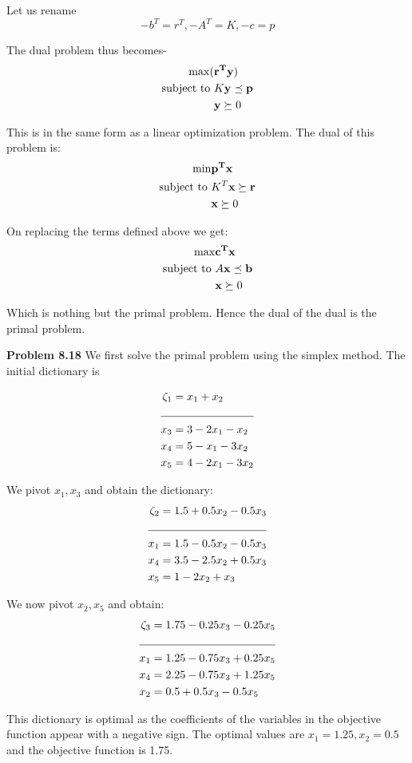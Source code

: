 \documentclass[letterpaper,12pt]{article}
\theoremstyle{definition}
\begin{document}
Let us rename $$-b^T=r^T, -A^T = K, -c = p$$

The dual problem thus becomes-
\begin{align*}
\max (&\mathbf{r^Ty}) \\
\textnormal{subject to } &K\textbf{y}\preceq \textbf{p}\\
&\textbf{y} \succeq 0\\
\end{align*}

This is in the same form as a linear optimization problem. The dual of this problem is:
\begin{align*}
\min &\mathbf{p^Tx} \\
\textnormal{subject to } &K^T\textbf{x}\succeq \textbf{r}\\
&\textbf{x} \succeq 0\\
\end{align*}

On replacing the terms defined above we get:
\begin{align*}
\max &\mathbf{c^Tx} \\
\textnormal{subject to } &A\textbf{x}\preceq \textbf{b}\\
&\textbf{x} \succeq 0\\
\end{align*}

Which is nothing but the primal problem. Hence the dual of the dual is the primal problem.

\vspace{3mm}
\noindent\textbf{Problem 8.18}
We first solve the primal problem using the simplex method. The initial dictionary is

\begin{align*}
  \zeta_1 &= x_1+x_2\\
  \cline{1-2}
  x_3 &= 3-2x_1-x_2\\
  x_4 &= 5-x_1-3x_2\\
  x_5 &= 4-2x_1-3x_2\\
\end{align*}

We pivot $x_1, x_3$ and obtain the dictionary:
\begin{align*}
  \zeta_2 &= 1.5 + 0.5x_2-0.5x_3\\
  \cline{1-2}
  x_1 &= 1.5 -0.5x_2-0.5x_3\\
  x_4 &= 3.5-2.5x_2+0.5x_3\\
  x_5 &= 1-2x_2+x_3\\
\end{align*}

We now pivot $x_2,x_5$ and obtain:
\begin{align*}
  \zeta_3 &= 1.75 - 0.25x_3-0.25x_5\\
  \cline{1-2}
  x_1 &= 1.25 - 0.75x_3+0.25x_5\\
  x_4 &= 2.25 - 0.75x_3+1.25x_5\\
  x_2 &= 0.5+0.5x_3-0.5x_5\\
\end{align*}

This dictionary is optimal as the coefficients of the variables in the objective function appear with a
negative sign. The optimal values are $x_1=1.25, x_2 = 0.5$ and the objective function is 1.75.
\end{document}
